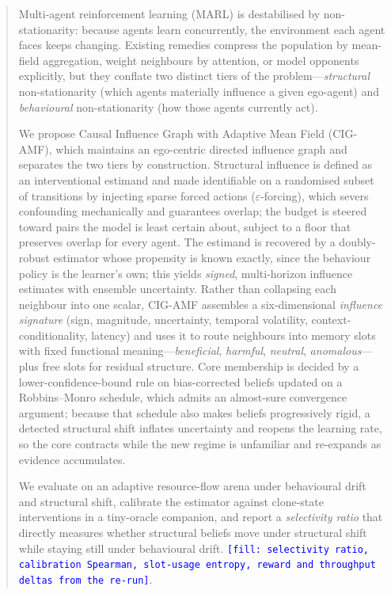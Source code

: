 \documentclass[conference]{IEEEtran}
\newcommand{\NUM}[1]{\textcolor{blue}{\texttt{[#1]}}}
\begin{document}
\begin{abstract}
Multi-agent reinforcement learning (MARL) is destabilised by non-stationarity: because agents learn concurrently, the environment each agent faces keeps changing. Existing remedies compress the population by mean-field aggregation, weight neighbours by attention, or model opponents explicitly, but they conflate two distinct tiers of the problem---\emph{structural} non-stationarity (which agents materially influence a given ego-agent) and \emph{behavioural} non-stationarity (how those agents currently act).

We propose Causal Influence Graph with Adaptive Mean Field (CIG-AMF), which maintains an ego-centric directed influence graph and separates the two tiers by construction. Structural influence is defined as an interventional estimand and made identifiable on a randomised subset of transitions by injecting sparse forced actions ($\varepsilon$-forcing), which severs confounding mechanically and guarantees overlap; the budget is steered toward pairs the model is least certain about, subject to a floor that preserves overlap for every agent. The estimand is recovered by a doubly-robust estimator whose propensity is known exactly, since the behaviour policy is the learner's own; this yields \emph{signed}, multi-horizon influence estimates with ensemble uncertainty. Rather than collapsing each neighbour into one scalar, CIG-AMF assembles a six-dimensional \emph{influence signature} (sign, magnitude, uncertainty, temporal volatility, context-conditionality, latency) and uses it to route neighbours into memory slots with fixed functional meaning---\emph{beneficial}, \emph{harmful}, \emph{neutral}, \emph{anomalous}---plus free slots for residual structure. Core membership is decided by a lower-confidence-bound rule on bias-corrected beliefs updated on a Robbins--Monro schedule, which admits an almost-sure convergence argument; because that schedule also makes beliefs progressively rigid, a detected structural shift inflates uncertainty and reopens the learning rate, so the core contracts while the new regime is unfamiliar and re-expands as evidence accumulates.

We evaluate on an adaptive resource-flow arena under behavioural drift and structural shift, calibrate the estimator against clone-state interventions in a tiny-oracle companion, and report a \emph{selectivity ratio} that directly measures whether structural beliefs move under structural shift while staying still under behavioural drift. \NUM{fill: selectivity ratio, calibration Spearman, slot-usage entropy, reward and throughput deltas from the re-run}.
\end{abstract}
\end{document}
